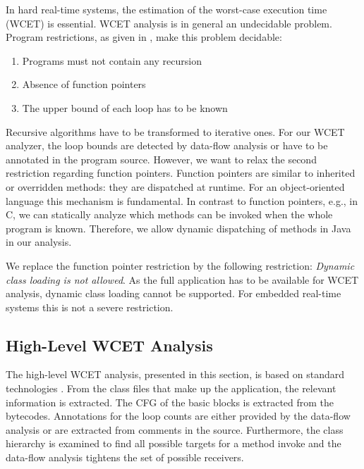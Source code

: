 In hard real-time systems, the estimation of the worst-case execution
time (WCET) is essential. WCET analysis is in general an undecidable
problem. Program restrictions, as given in \cite{pusch:maxt:jnl},
make this problem decidable:
\begin{enumerate}
    \item Programs must not contain any recursion
    \item Absence of function pointers
    \item The upper bound of each loop has to be known
\end{enumerate}
Recursive algorithms have to be transformed to iterative ones. For
our WCET analyzer, the loop bounds are detected by data-flow analysis
or have to be annotated in the program source. However, we want to
relax the second restriction regarding function pointers. Function
pointers are similar to inherited or overridden methods: they are
dispatched at runtime. For an object-oriented language this mechanism
is fundamental. In contrast to function pointers, e.g., in C, we can
statically analyze which methods can be invoked when the whole
program is known. Therefore, we allow dynamic dispatching of methods
in Java in our analysis.

We replace the function pointer restriction by the following
restriction: \emph{Dynamic class loading is not allowed}. As the full
application has to be available for WCET analysis, dynamic class
loading cannot be supported. For embedded real-time systems this is
not a severe restriction.

\subsection{High-Level WCET Analysis}

The high-level WCET analysis, presented in this section, is based on
standard technologies \cite{Puschner:JRTS1997, 216666}. From the
class files that make up the application, the relevant information is
extracted. The CFG of the basic blocks is extracted from the
bytecodes. Annotations for the loop counts are either provided by the
data-flow analysis or are extracted from comments in the source.
Furthermore, the class hierarchy is examined to find all possible
targets for a method invoke and the data-flow analysis tightens the
set of possible receivers.

